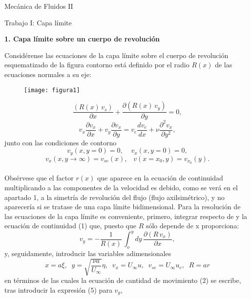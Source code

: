 \documentclass[11pt,a4paper]{article}
\begin{document}
\begin{center}
{\Huge Mecánica de Fluidos II}
\end{center}


\begin{center}
{\Large Trabajo I: Capa límite}
\end{center}
\begin{center}
{\Large  \textbf {1. Capa límite sobre un cuerpo de revolución}}
\end{center}
 
Considérense las ecuaciones de la capa límite sobre el cuerpo de revolución esquematizado de la figura contorno está definido por el radio $R(x)$ de las ecuaciones normales a su eje:



\begin{figure}[hb]
  \centering
  \texttt{[image: figura1]}
\end{figure}



\begin{equation}
\frac{(R(x)\, v_{s})}{\partial x} + \frac{\partial (R(x)\, v_{y})}{\partial y}=0,
\end{equation}
\begin{equation}
v_{x} \frac{\partial v_{x}}{\partial x} + v_{y} \frac{\partial v_{x}}{\partial y}= v_{e} \frac{d v_{e}}{d x} + \nu \frac{\partial^{2} v_{x}}{\partial y^{2}},
\end{equation}
junto con las condiciones de contorno
\begin{equation}
v_{y}(x,y=0)=0,\;\;\;\;v_{x}(x,y=0)=0,
\end{equation}
\begin{equation}
v_{x}(x,y\rightarrow \infty)=v_{se}(x), \;\;\; v(x=x_{0},y)=v_{x_{0}}(y).
\end{equation}
\\

Obsérvese que el factor $r(x)$ que aparece en la ecuación de continuidad multiplicando a las componentes de la velocidad es debido, como se verá en el apartado 1, a la simetría de revolución del flujo (flujo axilsimétrico), y no aparecería si se tratase de una capa límite bidimensional. Para la resolución de las ecuaciones de la capa límite es conveniente, primero, integrar respecto de y la ecuación de continuidad (1) que, puesto que $R$ sólo depende de x proporciona:
\begin{equation}
v_{y}=-\frac{1}{R(x)}\, \int_{o}^{y} dy\, \frac{\partial (R\, v_{x})}{\partial x},
\end{equation}
y, seguidamente, introducir las variables adimensionales
\begin{equation}
x=a\xi, \;\; y=\sqrt{\frac{\nu a}{U_{\infty}}}\eta, \;\; v_{x}=U_{\infty} u, \;\; v_{se}=U_{\infty} u_{e}, \;\; R=ar
\end{equation}
en términos de las cuales la ecuación de cantidad de movimiento (2) se escribe, tras introducir la expresión (5) para $v_{y}$,
\end{document}
